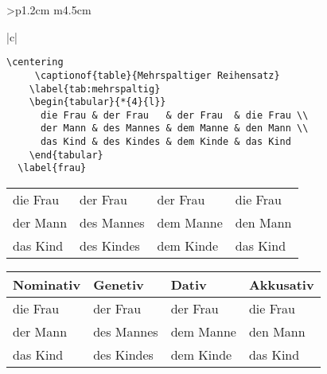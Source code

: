 \begin{tabular}{>{\bfseries}p{1.2cm} m{4.5cm}}
\begin{tabular}[t]{|c|}
\begin{longtable}
\begin{scriptexample}{}{}
\begin{verbatim}
\centering
     \captionof{table}{Mehrspaltiger Reihensatz}
    \label{tab:mehrspaltig}
    \begin{tabular}{*{4}{l}}
      die Frau & der Frau   & der Frau  & die Frau \\
      der Mann & des Mannes & dem Manne & den Mann \\
      das Kind & des Kindes & dem Kinde & das Kind
    \end{tabular}
  \label{frau}
\end{verbatim}
{    \centering
    \label{tab:mehrspaltig}
    \begin{tabular}{*{4}{l}}
      die Frau & der Frau   & der Frau  & die Frau \\
      der Mann & des Mannes & dem Manne & den Mann \\
      das Kind & des Kindes & dem Kinde & das Kind
    \end{tabular}
  \label{frau}
  
 }

\end{scriptexample}



{    \centering
    \label{tab:tabellensatz}
    \begin{tabular}{@{}*{4}{l}@{}}
      \toprule
        Nominativ & Genetiv & Dativ & Akkusativ \\
      \midrule
        die Frau & der Frau   & der Frau  & die Frau \\
        der Mann & des Mannes & dem Manne & den Mann \\
        das Kind & des Kindes & dem Kinde & das Kind \\
      \bottomrule
    \end{tabular}
} 


\end{longtable}
\end{tabular}
\end{tabular}
